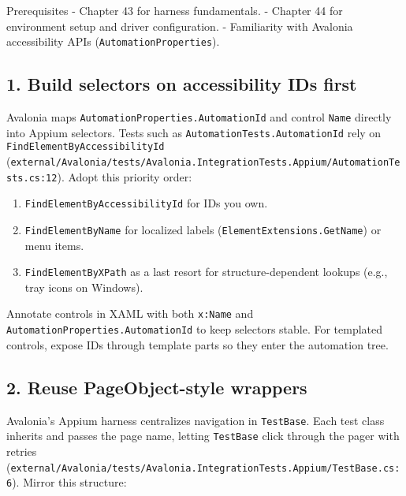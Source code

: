 Prerequisites - Chapter 43 for harness fundamentals. - Chapter 44 for
environment setup and driver configuration. - Familiarity with Avalonia
accessibility APIs (\passthrough{\lstinline!AutomationProperties!}).

\subsection{1. Build selectors on accessibility IDs
first}\label{build-selectors-on-accessibility-ids-first}

Avalonia maps
\passthrough{\lstinline!AutomationProperties.AutomationId!} and control
\passthrough{\lstinline!Name!} directly into Appium selectors. Tests
such as \passthrough{\lstinline!AutomationTests.AutomationId!} rely on
\passthrough{\lstinline!FindElementByAccessibilityId!}
(\passthrough{\lstinline!external/Avalonia/tests/Avalonia.IntegrationTests.Appium/AutomationTests.cs:12!}).
Adopt this priority order:

\begin{enumerate}
\def\labelenumi{\arabic{enumi}.}
\tightlist
\item
  \passthrough{\lstinline!FindElementByAccessibilityId!} for IDs you
  own.
\item
  \passthrough{\lstinline!FindElementByName!} for localized labels
  (\passthrough{\lstinline!ElementExtensions.GetName!}) or menu items.
\item
  \passthrough{\lstinline!FindElementByXPath!} as a last resort for
  structure-dependent lookups (e.g., tray icons on Windows).
\end{enumerate}

Annotate controls in XAML with both \passthrough{\lstinline!x:Name!} and
\passthrough{\lstinline!AutomationProperties.AutomationId!} to keep
selectors stable. For templated controls, expose IDs through template
parts so they enter the automation tree.

\subsection{2. Reuse PageObject-style
wrappers}\label{reuse-pageobject-style-wrappers}

Avalonia's Appium harness centralizes navigation in
\passthrough{\lstinline!TestBase!}. Each test class inherits and passes
the page name, letting \passthrough{\lstinline!TestBase!} click through
the pager with retries
(\passthrough{\lstinline!external/Avalonia/tests/Avalonia.IntegrationTests.Appium/TestBase.cs:6!}).
Mirror this structure:

